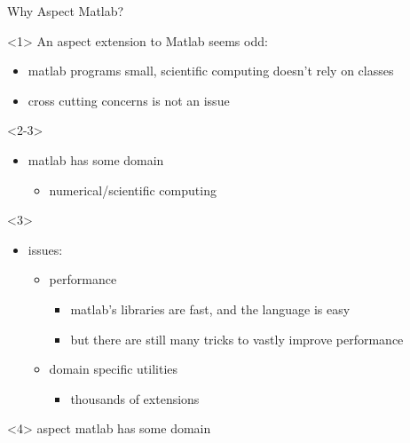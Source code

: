 \begin{frame}{Why Aspect Matlab?}
  \begin{onlyenv}<1>
    An aspect extension to Matlab seems odd:
    \begin{itemize}
    \item matlab programs small, scientific computing doesn't rely on classes
    \item cross cutting concerns is not an issue
    \end{itemize}
  \end{onlyenv}
  \begin{onlyenv}<2-3>
     
    \begin{itemize}
    \item matlab has some domain
      \begin{itemize}
      \item numerical/scientific computing
      \end{itemize}
    \end{itemize}
  \end{onlyenv}
  \begin{onlyenv}<3>
    \begin{itemize}
    \item issues:
      \begin{itemize}
      \item performance
        \begin{itemize}
        \item matlab's libraries are fast, and the language is easy
        \item but there are still many tricks to vastly improve
          performance
        \end{itemize}
      \item domain specific utilities
        \begin{itemize}
        \item thousands of extensions
        \end{itemize}
      \end{itemize}
    \end{itemize}
  \end{onlyenv}
  \begin{onlyenv}<4>
    aspect matlab has some domain
    \begin{itemize}

\end{itemize}
\end{onlyenv}
\end{frame}
